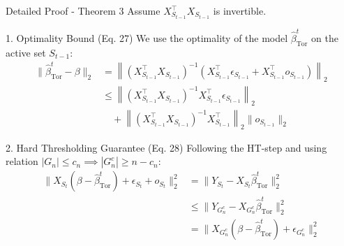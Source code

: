 \begin{frame}[shrink=5]{\normal Detailed Proof - Theorem 3}
Assume $X_{S_{t-1}}^\top X_{S_{t-1}}$ is invertible. 
    \begin{block}{1. Optimality Bound (Eq. 27)}
        We use the optimality of the model $\hat{\beta}_{\text{Tor}}^t$ on the active set $S_{t-1}$:
        \vspace{-0.3cm}
        \begin{align*}
        \|\hat{\beta}_{\text{Tor}}^t - \beta\|_2 &= \left\| (X_{S_{t-1}}^\top X_{S_{t-1}})^{-1} (X_{S_{t-1}}^\top \epsilon_{S_{t-1}} + X_{S_{t-1}}^\top o_{S_{t-1}}) \right\|_2 \\
        &\leq \left\| (X_{S_{t-1}}^\top X_{S_{t-1}})^{-1} X_{S_{t-1}}^\top \epsilon_{S_{t-1}} \right\|_2 \\
        &\quad + \left\| (X_{S_{t-1}}^\top X_{S_{t-1}})^{-1} X_{S_{t-1}}^\top \right\|_2 \|o_{S_{t-1}}\|_2
        \end{align*}
    \end{block}
    
    \begin{block}{2. Hard Thresholding Guarantee (Eq. 28)}
        Following the HT-step and using relation $|G_n| \leq c_n \implies |G_n^c| \geq n - c_n$:
        \vspace{-0.3cm}
        \begin{align*}
        \|X_{S_t} (\beta - \hat{\beta}_{\text{Tor}}^t) + \epsilon_{S_t} + o_{S_t}\|_2^2 &= \|Y_{S_t} - X_{S_t} \hat{\beta}_{\text{Tor}}^t\|_2^2 \\
        &\leq \|Y_{G_n^c} - X_{G_n^c} \hat{\beta}_{\text{Tor}}^t\|_2^2 \\
        &= \|X_{G_n^c} (\beta - \hat{\beta}_{\text{Tor}}^t) + \epsilon_{G_n^c}\|_2^2
        \end{align*}
    \end{block}
\end{frame}

